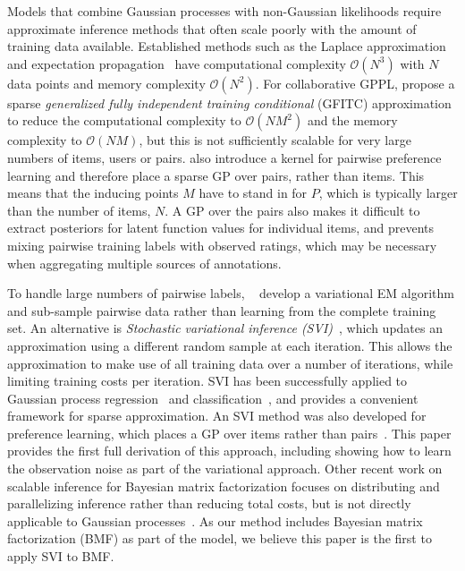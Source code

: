 Models that combine Gaussian processes with non-Gaussian likelihoods 
require approximate inference methods that often scale poorly with 
the amount of training data available. 
Established methods such as the Laplace approximation 
and expectation propagation~\citep{rasmussen_gaussian_2006} have
computational complexity $\mathcal{O}(N^3)$ with $N$ data points
 and memory complexity $\mathcal{O}(N^2)$. 
For collaborative GPPL, \citet{houlsby2012collaborative}
propose a sparse
\emph{generalized fully independent training conditional} (GFITC) 
approximation~\citep{snelson2006sparse} to reduce the computational complexity to $\mathcal{O}(NM^2)$
and the memory complexity to $\mathcal{O}(NM)$, but this is not sufficiently scalable
 for very large numbers of items, users or pairs.
\citet{houlsby2012collaborative} also introduce a kernel for pairwise 
preference learning and therefore place a sparse GP over pairs, rather than items. This
means that the inducing points $M$ have to stand in for $P$, which is typically larger than the number of 
items, $N$. 
A GP over the pairs also makes it difficult to extract posteriors for latent function values for individual items,
and prevents mixing pairwise training labels
with observed ratings, which may be necessary when aggregating multiple sources of annotations.

To handle large numbers of pairwise labels, ~\citet{khan2014scalable}
develop a variational EM algorithm and sub-sample pairwise data rather than learning from the complete training set.
An alternative is \emph{Stochastic variational inference (SVI)}~\citep{hoffman2013stochastic}, which updates an approximation using 
 a different random sample at each iteration. 
 This allows the approximation to make use of all training data over a number of 
 iterations, while limiting training costs per iteration.
SVI has been successfully applied to Gaussian process regression~\citep{hensman2013gaussian} and classification~\citep{hensman2015scalable},
and provides a convenient framework for sparse approximation.
 An SVI method was also developed for preference learning,
 which places a GP over items rather than pairs~\citep{simpson2018finding}.
This paper provides the first full derivation of this approach, including showing how to learn the observation noise
as part of the variational approach. 
 Other recent work on scalable inference for Bayesian matrix factorization focuses on distributing and parallelizing 
 inference rather than reducing total costs, but is not directly applicable to Gaussian processes~\citep{ahn2015large,vander2017distributed,chen2018large}. 
As our method includes Bayesian matrix factorization (BMF) as part of the model, 
we believe this paper is the first to apply SVI to BMF.
